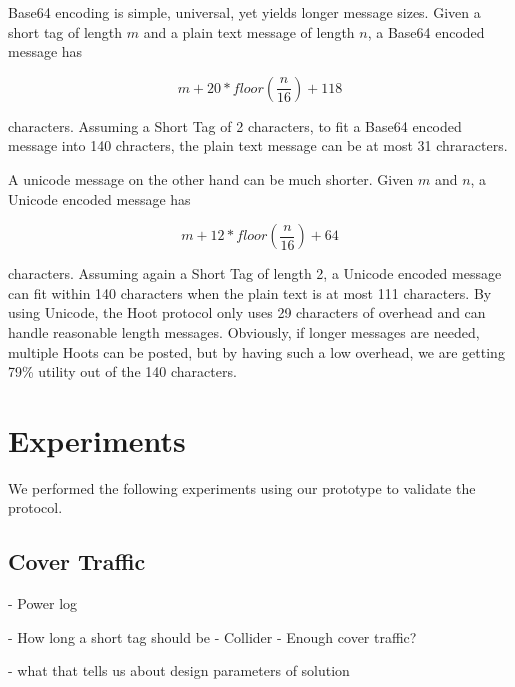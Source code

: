 \documentclass{acm_proc_article-sp}
\begin{document}
Base64 encoding is simple, universal, yet yields longer message sizes. Given a short tag of length $m$ and a plain text message of length $n$, a Base64 encoded message has

\begin{equation}
	m + 20 * floor(\frac{n}{16}) + 118
\end{equation}

characters. Assuming a Short Tag of 2 characters, to fit a Base64 encoded message into 140 chracters, the plain text message can be at most 31 chraracters.

A unicode message on the other hand can be much shorter. Given $m$ and $n$, a Unicode encoded message has

\begin{equation}
	m + 12 * floor(\frac{n}{16}) + 64
\end{equation}

characters. Assuming again a Short Tag of length 2, a Unicode encoded message can fit within 140 characters when the plain text is at most 111 characters. By using Unicode, the Hoot protocol only uses 29 characters of overhead and can handle reasonable length messages. Obviously, if longer messages are needed, multiple Hoots can be posted, but by having such a low overhead, we are getting 79\% utility out of the 140 characters.

\section{Experiments}

We performed the following experiments using our prototype to validate the protocol.

\subsection{Cover Traffic}


- Power log

- How long a short tag should be
- Collider
- Enough cover traffic?

- what that tells us about design parameters of solution
\end{document}

